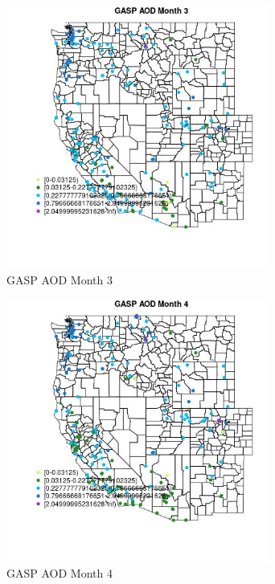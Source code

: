 \begin{figure} 
\centering  
\includegraphics[width=0.77\textwidth]{Code_Outputs/Report_ML_input_PM25_Step4_part_e_de_duplicated_aveswNAs_MapObsMo3GASP_AOD.jpg} 
\caption{\label{fig:Report_ML_input_PM25_Step4_part_e_de_duplicated_aveswNAsMapObsMo3GASP_AOD}GASP AOD Month 3} 
\end{figure} 
 

\begin{figure} 
\centering  
\includegraphics[width=0.77\textwidth]{Code_Outputs/Report_ML_input_PM25_Step4_part_e_de_duplicated_aveswNAs_MapObsMo4GASP_AOD.jpg} 
\caption{\label{fig:Report_ML_input_PM25_Step4_part_e_de_duplicated_aveswNAsMapObsMo4GASP_AOD}GASP AOD Month 4} 
\end{figure} 
 

